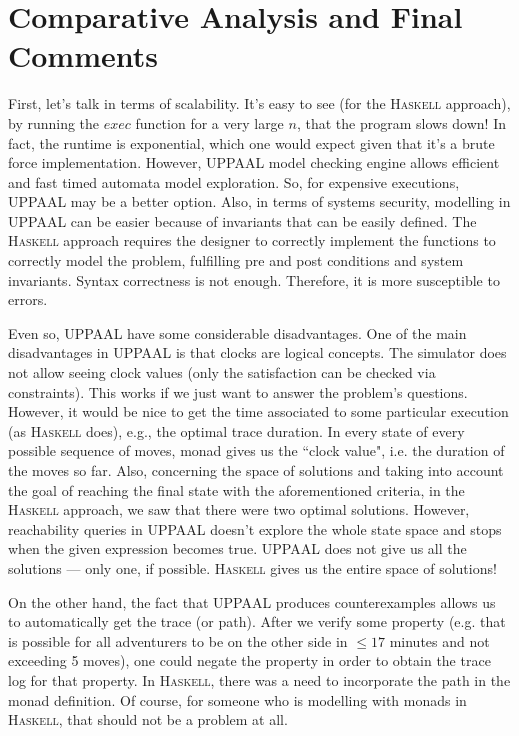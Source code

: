 \documentclass[a4paper]{article}
\def\aspas#1{``#1"}
\newcommand{\Varid}[1]{\mathit{#1}}
\renewcommand{\leq}{\leqslant}
\begin{document}
\section{Comparative Analysis and Final Comments}

First, let's talk in terms of scalability. It's easy to see (for the \textsc{Haskell} approach), by running the \ensuremath{\Varid{exec}} function for a very large \ensuremath{\Varid{n}}, that the program slows down! In fact, the runtime is exponential, which one would expect given that it's a brute force implementation. However, UPPAAL model checking engine allows efficient and fast timed automata model exploration. So, for expensive executions, UPPAAL may be a better option. Also, in terms of systems security, modelling in UPPAAL can be easier because of invariants that can be easily defined. The \textsc{Haskell} approach requires the designer to correctly implement the functions to correctly model the problem, fulfilling pre and post conditions and system invariants. Syntax correctness is not enough. Therefore, it is more susceptible to errors.

Even so, UPPAAL have some considerable disadvantages. One of the main disadvantages in UPPAAL is that clocks are logical concepts. The simulator does not allow seeing clock values (only the satisfaction can be checked via constraints). This works if we just want to answer the problem's questions. However, it would be nice to get the time associated to some particular execution (as \textsc{Haskell} does), e.g., the optimal trace duration. In every state of every possible sequence of moves, monad gives us the \aspas{clock value}, i.e. the duration of the moves so far. Also, concerning the space of solutions and taking into account the goal of reaching the final state with the aforementioned criteria, in the \textsc{Haskell} approach, we saw that there were two optimal solutions. However, reachability queries in UPPAAL doesn’t explore the whole state space and stops   
when the given expression becomes true. UPPAAL does not give us all the solutions --- only one, if possible. \textsc{Haskell} gives us the entire space of solutions!

On the other hand, the fact that UPPAAL produces counterexamples allows us to automatically get the trace (or path). After we verify some property (e.g. that is possible for all adventurers to be on the other side in \ensuremath{\leq \mathrm{17}} minutes and not exceeding 5 moves), one could negate the property in order to obtain the trace log for that property. In \textsc{Haskell}, there was a need to incorporate the path in the monad definition. Of course, for someone who is modelling with monads in \textsc{Haskell}, that should not be a problem at all.
\end{document}
